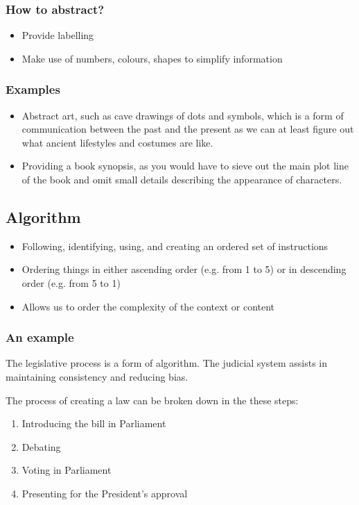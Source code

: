 \documentclass[11pt]{article}
\begin{document}
\subsubsection{How to abstract?}
\label{sec:org192e1cc}
\begin{itemize}
\item Provide labelling
\item Make use of numbers, colours, shapes to simplify information
\end{itemize}
\subsubsection{Examples}
\label{sec:orga02b493}
\begin{itemize}
\item Abstract art, such as cave drawings of dots and symbols, which is a form of communication between the past and the present as we can at least figure out what ancient lifestyles and costumes are like.
\item Providing a book synopsis, as you would have to sieve out the main plot line of the book and omit small details describing the appearance of characters.
\end{itemize}
\subsection{Algorithm}
\label{sec:orgc9d7f39}
\begin{itemize}
\item Following, identifying, using, and creating an ordered set of instructions
\item Ordering things in either ascending order (e.g. from 1 to 5) or in descending order (e.g. from 5 to 1)
\item Allows us to order the complexity of the context or content
\end{itemize}
\subsubsection{An example}
\label{sec:orgaedcb04}
The legislative process is a form of algorithm. The judicial system assists in maintaining consistency and reducing bias.

The process of creating a law can be broken down in the these steps:
\begin{enumerate}
\item Introducing the bill in Parliament
\item Debating
\item Voting in Parliament
\item Presenting for the President's approval
\end{enumerate}
\end{document}
